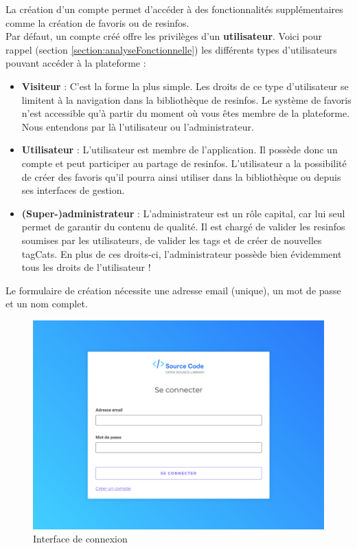 La création d'un compte permet d'accéder à des fonctionnalités supplémentaires comme la création de favoris ou de \glspl{resinfo}.\\

Par défaut, un compte créé offre les privilèges d'un \textbf{utilisateur}. Voici pour rappel (section \ref{section:analyseFonctionnelle}) les différents types d'utilisateurs pouvant accéder à la plateforme :

\begin{itemize}
    \item \textbf{Visiteur} : C'est la forme la plus simple. Les droits de ce type d'utilisateur se limitent à la navigation dans la bibliothèque de \glspl{resinfo}. Le système de favoris n'est accessible qu'à partir du moment où vous êtes membre de la plateforme. Nous entendons par là l'utilisateur ou l'administrateur.
    \item \textbf{Utilisateur} : L'utilisateur est membre de l'application. Il possède donc un compte et peut participer au partage de \glspl{resinfo}. L'utilisateur a la possibilité de créer des favoris qu'il pourra ainsi utiliser dans la bibliothèque ou depuis ses interfaces de gestion.
    \item \textbf{(Super-)administrateur} : L'administrateur est un rôle capital, car lui seul permet de garantir du contenu de qualité. Il est chargé de valider les \glspl{resinfo} soumises par les utilisateurs, de valider les \glspl{tag} et de créer de nouvelles \glspl{tagCat}. En plus de ces droits-ci, l'administrateur possède bien évidemment tous les droits de l'utilisateur !
\end{itemize}

Le formulaire de création nécessite une adresse email (unique), un mot de passe et un nom complet.


\begin{figure}[H]
    \includegraphics[width=\textwidth,height=0.35\textheight,keepaspectratio]{images/client/login.png}
    \centering
    \caption[SourceCode : interface de connexion]{Interface de connexion}
\end{figure}

